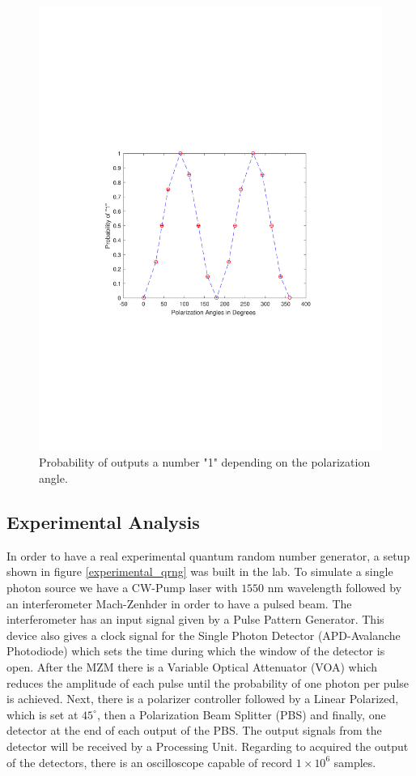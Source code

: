 \begin{figure}[H]
    \centering
        \includegraphics[clip, trim=4cm 9cm 4cm 6cm, width=1.00\textwidth]{./sdf/qrng/figures_raw/prob1.pdf}
    \caption{Probability of outputs a number "1" \space depending on the polarization angle.}\label{proby}
\end{figure}

\subsection{Experimental Analysis}

In order to have a real experimental quantum random number generator, a setup shown in figure \ref{experimental_qrng} was built in the lab. To simulate a single photon source we have a CW-Pump laser with $1550$ nm wavelength followed by an interferometer Mach-Zenhder in order to have a pulsed beam. The interferometer has an input signal given by a Pulse Pattern Generator. This device also gives a clock signal for the Single Photon Detector (APD-Avalanche Photodiode) which sets the time during which the window of the detector is open. After the MZM there is a Variable Optical Attenuator (VOA) which reduces the amplitude of each pulse until the probability of one photon per pulse is achieved. Next, there is a polarizer controller followed by a Linear Polarized, which is set at $45^{\circ}$, then a Polarization Beam Splitter (PBS) and finally, one detector at the end of each output of the PBS. The output signals from the detector will be received by a Processing Unit. Regarding to acquired the output of the detectors, there is an oscilloscope capable of record $1 \times 10^{6}$ samples.



